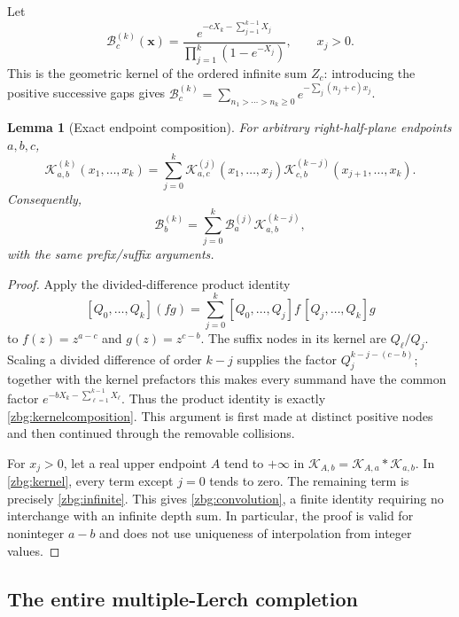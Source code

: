 \documentclass[11pt,letterpaper]{article}
\numberwithin{equation}{section}
\theoremstyle{plain}
\newtheorem{lemma}[theorem]{Lemma}
\theoremstyle{definition}
\theoremstyle{remark}
\begin{document}
Let
\begin{equation}\label{zbg:infinite}
 \mathscr B_c^{(k)}(\boldsymbol x)
 =\frac{e^{-cX_k-\sum_{j=1}^{k-1}X_j}}
              {\prod_{j=1}^k(1-e^{-X_j})},\qquad x_j>0.
\end{equation}
This is the geometric kernel of the ordered infinite sum $Z_c$:
introducing the positive successive gaps gives
$\mathscr B_c^{(k)}=\sum_{n_1>\cdots>n_k\geq0}
e^{-\sum_j(n_j+c)x_j}$.

\begin{lemma}[Exact endpoint composition]\label{zbg:composition}
For arbitrary right-half-plane endpoints $a,b,c$,
\begin{equation}\label{zbg:kernelcomposition}
 \mathscr K_{a,b}^{(k)}(x_1,\ldots,x_k)
 =\sum_{j=0}^k
   \mathscr K_{a,c}^{(j)}(x_1,\ldots,x_j)
   \mathscr K_{c,b}^{(k-j)}(x_{j+1},\ldots,x_k).
\end{equation}
Consequently,
\begin{equation}\label{zbg:convolution}
 \mathscr B_b^{(k)}=\sum_{j=0}^k
                       \mathscr B_a^{(j)}\mathscr K_{a,b}^{(k-j)},
\end{equation}
with the same prefix/suffix arguments.
\end{lemma}

\begin{proof}
Apply the divided-difference product identity
\[
 [Q_0,\ldots,Q_k](fg)=\sum_{j=0}^k
 [Q_0,\ldots,Q_j]f\,[Q_j,\ldots,Q_k]g
\]
to $f(z)=z^{a-c}$ and $g(z)=z^{c-b}$.  The suffix nodes in its
kernel are $Q_\ell/Q_j$.  Scaling a divided difference of order
$k-j$ supplies the factor $Q_j^{k-j-(c-b)}$; together with the
kernel prefactors this makes every summand have the common factor
$e^{-bX_k-\sum_{\ell=1}^{k-1}X_\ell}$.  Thus the product identity
is exactly \eqref{zbg:kernelcomposition}.  This argument is first
made at distinct positive nodes and then continued through the
removable collisions.

For $x_j>0$, let a real upper endpoint $A$ tend to $+\infty$ in
$\mathscr K_{A,b}=\mathscr K_{A,a}*\mathscr K_{a,b}$.  In
\eqref{zbg:kernel}, every term except $j=0$ tends to zero.  The
remaining term is precisely \eqref{zbg:infinite}.  This gives
\eqref{zbg:convolution}, a finite identity requiring no interchange
with an infinite depth sum.  In particular, the proof is valid for
noninteger $a-b$ and does not use uniqueness of interpolation from
integer values.
\end{proof}

\subsection{The entire multiple-Lerch completion}
\end{document}
